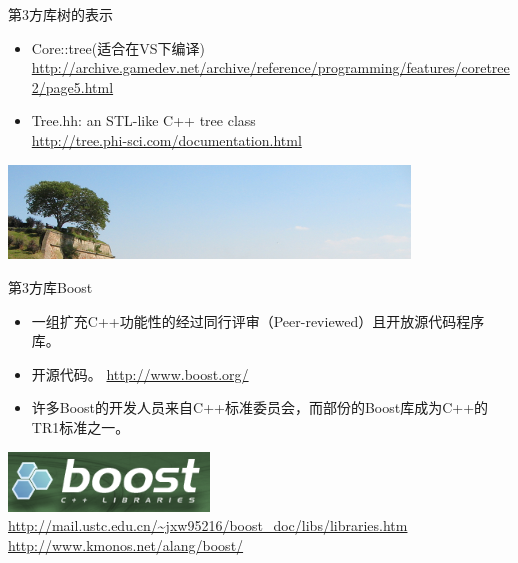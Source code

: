 \begin{frame}[t, fragile]{第3方库}{树的表示}%
  \begin{itemize}
  \item Core::tree(适合在VS下编译)\\
    {\tiny \url{http://archive.gamedev.net/archive/reference/programming/features/coretree2/page5.html}}
  \item Tree.hh: an STL-like C++ tree class\\
    {\tiny \url{http://tree.phi-sci.com/documentation.html}}
  \end{itemize}
  \begin{center}
    \includegraphics[width=0.8\textwidth]{figure/chap07/11tree}
  \end{center}
\end{frame}

\begin{frame}[t, fragile]{第3方库}{Boost}%
  \begin{itemize}
  \item 一组扩充C++功能性的经过同行评审（Peer-reviewed）且开放源代码程序库。
  \item 开源代码。{ \url{http://www.boost.org/}}
  \item 许多Boost的开发人员来自C++标准委员会，而部份的Boost库成为C++的TR1标准之一。
  \end{itemize}
  \begin{center}
    \includegraphics[width=0.4\textwidth]{figure/chap07/12boost}\\
    {\tiny \url{http://mail.ustc.edu.cn/~jxw95216/boost_doc/libs/libraries.htm}}
    {\tiny \url{http://www.kmonos.net/alang/boost/}}
  \end{center}  
\end{frame}

